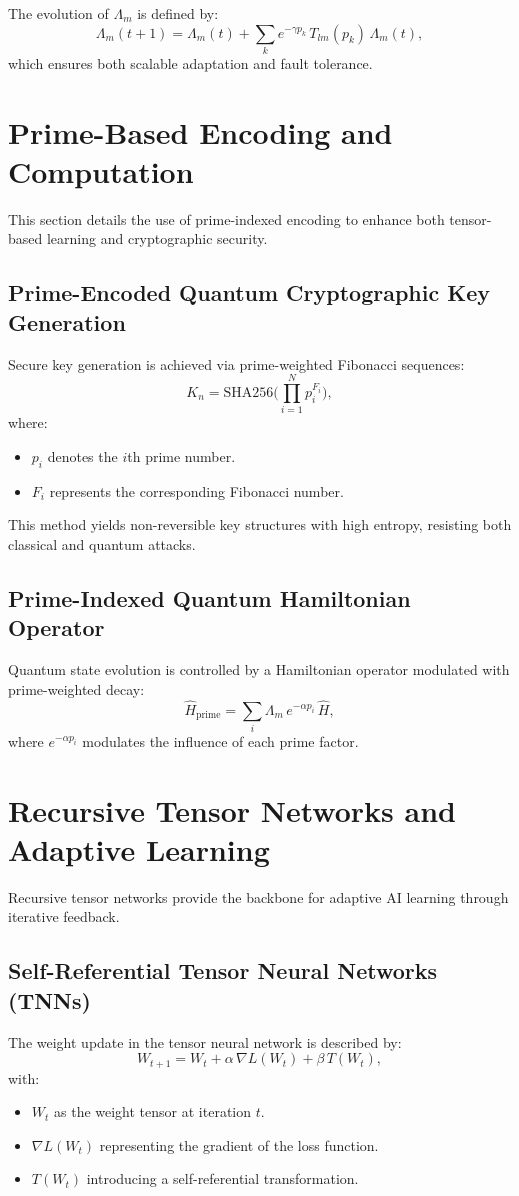 \documentclass{article}
\theoremstyle{plain}
\begin{document}
The evolution of $\Lambda_m$ is defined by:
\[
\Lambda_m(t+1) = \Lambda_m(t) + \sum_{k} e^{-\gamma p_k}\, T_{lm}(p_k)\, \Lambda_m(t),
\]
which ensures both scalable adaptation and fault tolerance.

\section{Prime-Based Encoding and Computation}
This section details the use of prime-indexed encoding to enhance both tensor-based learning and cryptographic security.

\subsection{Prime-Encoded Quantum Cryptographic Key Generation}
Secure key generation is achieved via prime-weighted Fibonacci sequences:
\[
K_n = \text{SHA256}\!\Biggl(\prod_{i=1}^{N} p_i^{F_i}\Biggr),
\]
where:
\begin{itemize}
    \item $p_i$ denotes the $i$th prime number.
    \item $F_i$ represents the corresponding Fibonacci number.
\end{itemize}
This method yields non-reversible key structures with high entropy, resisting both classical and quantum attacks.

\subsection{Prime-Indexed Quantum Hamiltonian Operator}
Quantum state evolution is controlled by a Hamiltonian operator modulated with prime-weighted decay:
\[
\hat{H}_{\text{prime}} = \sum_{i} \Lambda_m\, e^{-\alpha p_i}\, \hat{H},
\]
where $e^{-\alpha p_i}$ modulates the influence of each prime factor.

\section{Recursive Tensor Networks and Adaptive Learning}
Recursive tensor networks provide the backbone for adaptive AI learning through iterative feedback.

\subsection{Self-Referential Tensor Neural Networks (TNNs)}
The weight update in the tensor neural network is described by:
\[
W_{t+1} = W_t + \alpha\, \nabla L(W_t) + \beta\, T(W_t),
\]
with:
\begin{itemize}
    \item $W_t$ as the weight tensor at iteration $t$.
    \item $\nabla L(W_t)$ representing the gradient of the loss function.
    \item $T(W_t)$ introducing a self-referential transformation.
\end{itemize}
\end{document}
